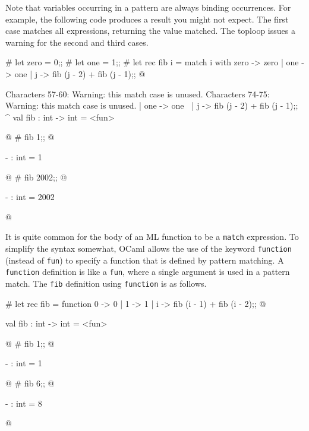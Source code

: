 Note that variables occurring in a pattern are always binding
occurrences.  For example, the following code produces a result you
might not expect.  The first case matches all expressions, returning
the value matched.  The toploop issues a warning for the second and
third cases.

\begin{ocaml}
# let zero = 0;;
# let one = 1;;
# let rec fib i =
     match i with
        zero -> zero
      | one -> one
      | j -> fib (j - 2) + fib (j - 1);;
@
\begin{toperror}
Characters 57-60:
Warning: this match case is unused.
Characters 74-75:
Warning: this match case is unused.
      | one -> one
        ^^^
      | j -> fib (j - 2) + fib (j - 1);;
        ^
val fib : int -> int = <fun>
\end{toperror}
@
# fib 1;;
@
\begin{topoutput}
- : int = 1
\end{topoutput}
@
# fib 2002;;
@
\begin{topoutput}
- : int = 2002
\end{topoutput}
@
\end{ocaml}

\label{keyword:function}

It is quite common for the body of an ML function to be a \hbox{\lstinline/match/}
expression.  To simplify the syntax somewhat, OCaml allows the use of the
keyword \hbox{\lstinline/function/} (instead of \hbox{\lstinline/fun/}) to specify a function
that is defined by pattern matching.  A \hbox{\lstinline/function/} definition is
like a \hbox{\lstinline/fun/}, where a single argument is used in a pattern match.
The \hbox{\lstinline/fib/} definition using \hbox{\lstinline/function/} is as follows.

\begin{ocaml}
# let rec fib = function
     0 -> 0
   | 1 -> 1
   | i -> fib (i - 1) + fib (i - 2);;
@
\begin{topoutput}
val fib : int -> int = <fun>
\end{topoutput}
@
# fib 1;;
@
\begin{topoutput}
- : int = 1
\end{topoutput}
@
# fib 6;;
@
\begin{topoutput}
- : int = 8
\end{topoutput}
@
\end{ocaml}

\label{patterns:choice}

